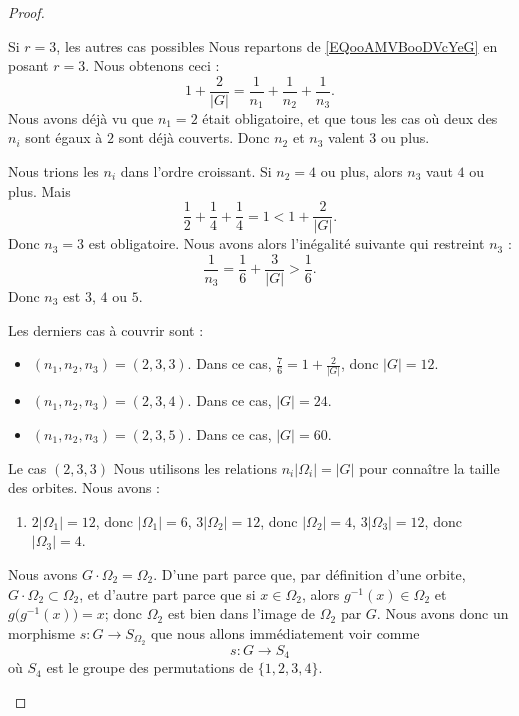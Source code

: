 \begin{proof}
\begin{subproof}
		\item[Si \( r=3\), les autres cas possibles]
		Nous repartons de \eqref{EQooAMVBooDVcYeG} en posant \( r=3\). Nous obtenons ceci :
		\begin{equation}
			1+\frac{ 2 }{ | G | }=\frac{1}{ n_1 }+\frac{1}{ n_2 }+\frac{1}{ n_3 }.
		\end{equation}
		Nous avons déjà vu que \( n_1=2\) était obligatoire, et que tous les cas où deux des \( n_i\) sont égaux à \( 2\) sont déjà couverts. Donc \( n_2\) et \( n_3\) valent \( 3\) ou plus.

		Nous trions les \( n_i\) dans l'ordre croissant. Si \( n_2=4\) ou plus, alors \( n_3\) vaut \( 4\) ou plus. Mais
		\begin{equation}
			\frac{ 1 }{2}+\frac{1}{ 4 }+\frac{1}{ 4 }=1<1+\frac{ 2 }{ | G | }.
		\end{equation}
		Donc \( n_3=3\) est obligatoire. Nous avons alors l'inégalité suivante qui restreint \( n_3\) :
		\begin{equation}
			\frac{1}{ n_3 }=\frac{1}{ 6 }+\frac{ 3 }{ | G | }>\frac{1}{ 6 }.
		\end{equation}
		Donc \( n_3\) est \( 3\), \( 4\) ou \( 5\).

		Les derniers cas à couvrir sont :
		\begin{itemize}
			\item \( (n_1,n_2,n_3)=(2,3,3)\). Dans ce cas, \( \frac{ 7 }{ 6 }=1+\frac{ 2 }{ | G | }\), donc \( | G |=12\).
			\item \( (n_1,n_2,n_3)=(2,3,4)\). Dans ce cas, \( | G |=24\).
			\item \( (n_1,n_2,n_3)=(2,3,5)\). Dans ce cas, \( | G |=60\).
		\end{itemize}

		\item[Le cas \( (2,3,3)\)]
		Nous utilisons les relations \( n_i| \Omega_i |=| G |\) pour connaître la taille des orbites. Nous avons :
		\begin{enumerate}
			\item
			      \( 2| \Omega_1 |=12\), donc \( | \Omega_1 |=6\),
			      \( 3| \Omega_2 |=12\), donc \( | \Omega_2 |=4\),
			      \( 3| \Omega_3 |=12\), donc \( | \Omega_3 |=4\).
		\end{enumerate}

		Nous avons \( G\cdot \Omega_2=\Omega_2\). D'une part parce que, par définition d'une orbite, \( G\cdot\Omega_2\subset\Omega_2\), et d'autre part parce que si \( x\in\Omega_2\), alors \( g^{-1}(x)\in\Omega_2\) et \( g\big( g^{-1}(x) \big)=x\); donc \( \Omega_2\) est bien dans l'image de \( \Omega_2\) par \( G\). Nous avons donc un morphisme \( s\colon G\to S_{\Omega_2}\) que nous allons immédiatement voir comme
		\begin{equation}
			s\colon G\to S_4
		\end{equation}
		où \( S_4\) est le groupe des permutations de \( \{ 1,2,3,4 \}\).


\end{subproof}
\end{proof}
